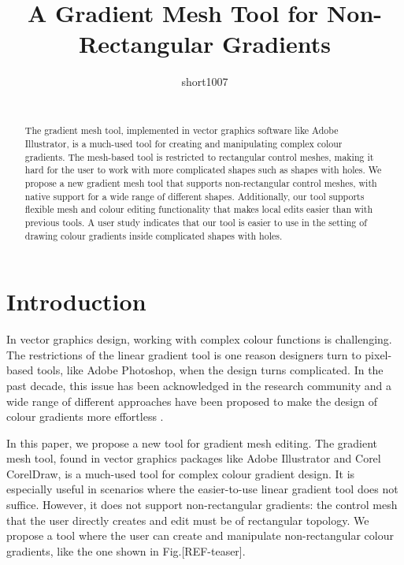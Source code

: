 \documentclass{egpubl}
\title[Non-rectangular gradient mesh tool]
{A Gradient Mesh Tool for Non-Rectangular Gradients}
\author[short1007]
{\parbox{\textwidth}{\centering short1007}
	\\
	{\parbox{\textwidth}{\centering } }
}
\begin{document}
	
	
	\maketitle
	
	\begin{abstract}
		The gradient mesh tool, implemented in vector graphics software like Adobe Illustrator, is a much-used tool for creating and manipulating complex colour gradients. The mesh-based tool is restricted to rectangular control meshes, making it hard for the user to work with more complicated shapes such as shapes with holes. We propose a new gradient mesh tool that supports non-rectangular control meshes, with native support for a wide range of different shapes. Additionally, our tool supports flexible mesh and colour editing functionality that makes local edits easier than with previous tools. A user study indicates that our tool is easier to use in the setting of drawing colour gradients inside complicated shapes with holes.
		
		\begin{classification} %
		\end{classification}
		
	\end{abstract}
	
	\section{Introduction}
	\label{sec:intro}
	
	In vector graphics design, working with complex colour functions is challenging. The restrictions of the linear gradient tool is one reason designers turn to pixel-based tools, like Adobe Photoshop, when the design turns complicated. In the past decade, this issue has been acknowledged in the research community and a wide range of different approaches have been proposed to make the design of colour gradients more effortless \cite{Orzan:2008,Lopez-Moreno:2013}.
	
	In this paper, we propose a new tool for gradient mesh editing. The gradient mesh tool, found in vector graphics packages like Adobe Illustrator and Corel CorelDraw, is a much-used tool for complex colour gradient design.	It is especially useful in scenarios where the easier-to-use linear gradient tool does not suffice. However, it does not support non-rectangular gradients: the control mesh that the user directly creates and edit must be of rectangular topology. We propose a tool where the user can create and manipulate non-rectangular colour gradients, like the one shown in Fig.[REF-teaser].
	
\end{document}
